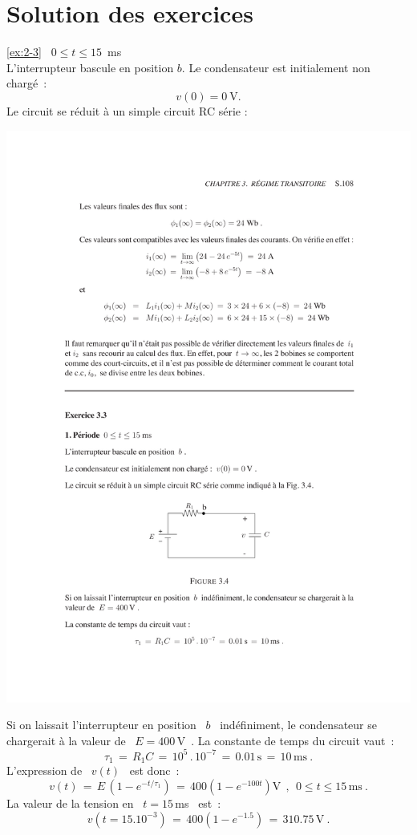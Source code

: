 \section{Solution des exercices}
\begin{solexercise}{\ref{ex:2-3}} \label{solex:2-3}
 \ $0 \leq t \leq 15$~ms\\
L'interrupteur bascule en position $b$. 
Le condensateur est initialement non charg\'e~: $$v(0) = 0 \ \text{V}.$$
Le circuit se r\'eduit \`a un simple circuit RC s\'erie :
\begin{center}
\includegraphics[width=0.55\linewidth]{sol_exercices/ex3-3-1}
\end{center}
Si on laissait l'interrupteur en position \ $b$ \ ind\'efiniment, le
condensateur se chargerait \`a la valeur de \ $E = 400\,$V~.
La constante de temps du circuit vaut~:
\[ \tau_1 \, = \, R_1C \, = \, 10^5\, . \, 10^{-7}\, 
= \, 0.01\,\mbox{s}\, = \, 10\,\mbox{ms}~. \]
L'expression de \ $v(t)$ \ est donc~:
\[ v(t) \, = \, E\, \left( 1-e^{-t/\tau_1}\right)  \, 
= \, 400\left( 1 - e^{-100t}\right) \mbox{V}~~, ~~0 \leq t \leq 15\,\mbox{ms}~. \] 
La valeur de la tension en \ $t=15\,$ms \ est~:
\[ v \left( t=15.10^{-3}\right) \, = \, 400\left( 1-e^{-1.5}\right) \, 
= \, 310.75\,\mbox{V}~. \]


\end{solexercise}
